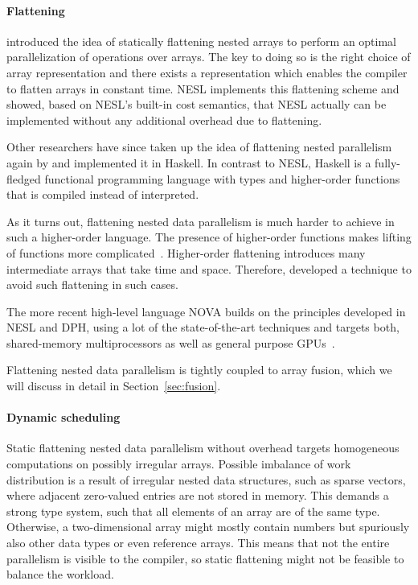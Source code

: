 \documentclass[a4paper]{article}
\begin{document}
\paragraph{Flattening}

\citet{Blelloch1993Implementation} introduced the idea of statically
flattening nested arrays to perform an optimal parallelization of
operations over arrays. The key to doing so is the right choice of
array representation and there exists a representation which enables
the compiler to flatten arrays in constant time. NESL implements this
flattening scheme and \citet{Blelloch:1996:PTS:232627.232650} showed,
based on NESL's built-in cost semantics, that NESL actually can be
implemented without any additional overhead due to flattening.

Other researchers have since taken up the idea of flattening nested
parallelism again by \citet{Lippmeier:2012:WEH:2364527.2364564} and
implemented it in Haskell. In contrast to NESL, Haskell is a
fully-fledged functional programming language with types and
higher-order functions that is compiled instead of interpreted.

As it turns out, flattening nested data parallelism is much harder to
achieve in such a higher-order language. The presence of higher-order
functions makes lifting of functions more
complicated~\cite{Lippmeier:2012:WEH:2364527.2364564}. Higher-order
flattening introduces many intermediate arrays that take time and
space. Therefore, \citet{Keller:2012:VA:2364506.2364512} developed a
technique to avoid such flattening in such cases.

The more recent high-level language NOVA builds on the principles
developed in NESL and DPH, using a lot of the state-of-the-art
techniques and targets both, shared-memory multiprocessors as well as
general purpose GPUs~\cite{Collins:2014:NFL:2627373.2627375}.

Flattening nested data parallelism is tightly coupled to array fusion,
which we will discuss in detail in Section~\ref{sec:fusion}.

\paragraph{Dynamic scheduling}

Static flattening nested data parallelism without overhead targets
homogeneous computations on possibly irregular arrays. Possible
imbalance of work distribution is a result of irregular nested data
structures, such as sparse vectors, where adjacent zero-valued entries
are not stored in memory. This demands a strong type system, such that
all elements of an array are of the same type. Otherwise, a
two-dimensional array might mostly contain numbers but spuriously also
other data types or even reference arrays. This means that not the
entire parallelism is visible to the compiler, so static flattening
might not be feasible to balance the workload.
\end{document}
